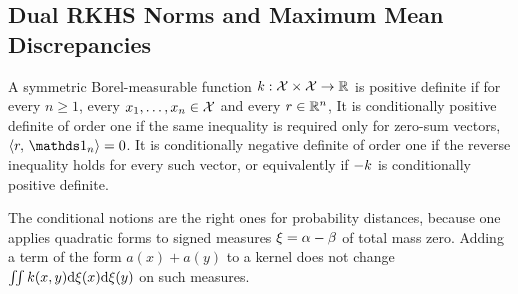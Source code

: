 \subsection{Dual RKHS Norms and Maximum Mean Discrepancies}
\label{sec-rkhs-mmd}
\begin{defn}\label{def-positive-kernels}
A symmetric Borel-measurable function $k:\mathcal{X}\times\mathcal{X}\to\mathbb{R}$ is positive definite if for every $n\geq1$, every $x_1,\ldots,x_n\in\mathcal{X}$ and every $r\in\mathbb{R}^n$,
It is conditionally positive definite of order one if the same inequality is required only for zero-sum vectors, $\dotp{r}{\ones_n}=0$. It is conditionally negative definite of order one if the reverse inequality holds for every such vector, or equivalently if $-k$ is conditionally positive definite.
\end{defn}
The conditional notions are the right ones for probability distances, because one applies quadratic forms to signed measures $\xi=\alpha-\beta$ of total mass zero. Adding a term of the form $a(x)+a(y)$ to a kernel does not change $\iint k(x,y)\mathrm{d}\xi(x)\mathrm{d}\xi(y)$ on such measures.

